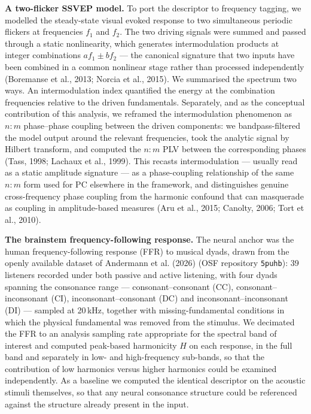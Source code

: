 \documentclass[11pt]{article}
\begin{document}
\textbf{A two-flicker SSVEP model.} To port the descriptor to frequency tagging, we modelled the steady-state visual evoked response to two simultaneous periodic flickers at frequencies $f_1$ and $f_2$. The two driving signals were summed and passed through a static nonlinearity, which generates intermodulation products at integer combinations $a f_1 \pm b f_2$ — the canonical signature that two inputs have been combined in a common nonlinear stage rather than processed independently (Boremanse et al., 2013; Norcia et al., 2015). We summarised the spectrum two ways. An intermodulation index quantified the energy at the combination frequencies relative to the driven fundamentals. Separately, and as the conceptual contribution of this analysis, we reframed the intermodulation phenomenon as $n{:}m$ phase–phase coupling between the driven components: we bandpass-filtered the model output around the relevant frequencies, took the analytic signal by Hilbert transform, and computed the $n{:}m$ PLV between the corresponding phases (Tass, 1998; Lachaux et al., 1999). This recasts intermodulation — usually read as a static amplitude signature — as a phase-coupling relationship of the same $n{:}m$ form used for $\mathrm{PC}$ elsewhere in the framework, and distinguishes genuine cross-frequency phase coupling from the harmonic confound that can masquerade as coupling in amplitude-based measures (Aru et al., 2015; Canolty, 2006; Tort et al., 2010).

\textbf{The brainstem frequency-following response.} The neural anchor was the human frequency-following response (FFR) to musical dyads, drawn from the openly available dataset of Andermann et al. (2026) (OSF repository \texttt{5puhb}): 39 listeners recorded under both passive and active listening, with four dyads spanning the consonance range — consonant–consonant (CC), consonant–inconsonant (CI), inconsonant–consonant (DC) and inconsonant–inconsonant (DI) — sampled at 20\,kHz, together with missing-fundamental conditions in which the physical fundamental was removed from the stimulus. We decimated the FFR to an analysis sampling rate appropriate for the spectral band of interest and computed peak-based harmonicity $H$ on each response, in the full band and separately in low- and high-frequency sub-bands, so that the contribution of low harmonics versus higher harmonics could be examined independently. As a baseline we computed the identical descriptor on the acoustic stimuli themselves, so that any neural consonance structure could be referenced against the structure already present in the input.
\end{document}
